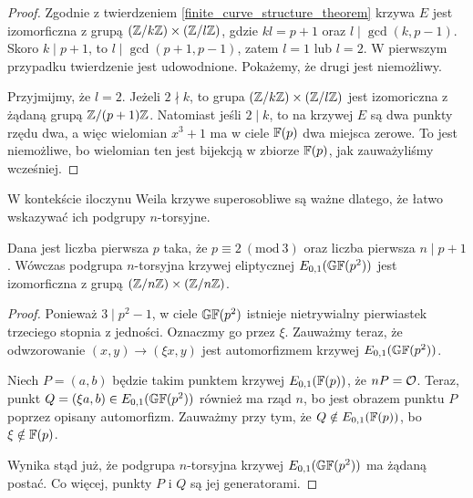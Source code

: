 \begin{proof}
Zgodnie z twierdzeniem \ref{finite_curve_structure_theorem}
krzywa $E$ jest izomorficzna z grupą $(\mathbb{Z} / k\mathbb{Z}) \times (\mathbb{Z} / l\mathbb{Z})$,
gdzie $kl = p+1$ oraz $l \mid \gcd(k, p-1)$.
Skoro $k \mid p+1$, to $l \mid \gcd(p+1, p-1)$,
zatem $l = 1$ lub $l = 2$.
W pierwszym przypadku twierdzenie jest udowodnione.
Pokażemy, że drugi jest niemożliwy.

Przyjmijmy, że $l = 2$.
Jeżeli $2 \nmid k$,
to grupa $(\mathbb{Z} / k\mathbb{Z}) \times (\mathbb{Z} / l\mathbb{Z})$ jest izomoriczna
z żądaną grupą $\mathbb{Z} / (p+1)\mathbb{Z}$.
Natomiast jeśli $2 \mid k$, to na krzywej $E$ są dwa punkty rzędu dwa,
a więc wielomian $x^3 + 1$ ma w ciele $\mathbb{F}(p)$ dwa miejsca zerowe.
To jest niemożliwe, bo wielomian ten jest bijekcją w zbiorze $\mathbb{F}(p)$,
jak zauważyliśmy wcześniej.
\end{proof}

W kontekście iloczynu Weila krzywe superosobliwe są ważne dlatego,
że łatwo wskazywać ich podgrupy $n$-torsyjne.

\begin{theorem}
Dana jest liczba pierwsza $p$ taka, że $p \equiv 2\ (\mathrm{mod}\ 3)$
oraz liczba pierwsza $n \mid p + 1$.
Wówczas podgrupa $n$-torsyjna krzywej eliptycznej $E_{0,1}(\mathbb{GF}(p^2))$
jest izomorficzna z grupą $(\mathbb{Z} / n\mathbb{Z}) \times (\mathbb{Z} / n\mathbb{Z})$.
\end{theorem}

\begin{proof}
Ponieważ $3 \mid p^2-1$, w ciele $\mathbb{GF}(p^2)$
istnieje nietrywialny pierwiastek trzeciego stopnia z jedności.
Oznaczmy go przez $\xi$.
Zauważmy teraz, że odwzorowanie $(x, y) \to (\xi x, y)$
jest automorfizmem krzywej $E_{0,1}(\mathbb{GF}(p^2))$.

Niech $P = (a, b)$ będzie takim punktem krzywej $E_{0,1}(\mathbb{F}(p))$,
że $nP = \mathcal{O}$.
Teraz, punkt $Q = (\xi a, b) \in E_{0,1}(\mathbb{GF}(p^2))$ również ma rząd $n$,
bo jest obrazem punktu $P$ poprzez opisany automorfizm.
Zauważmy przy tym, że $Q \notin E_{0,1}(\mathbb{F}(p))$,
bo $\xi \notin \mathbb{F}(p)$.

Wynika stąd już, że podgrupa $n$-torsyjna krzywej $E_{0,1}(\mathbb{GF}(p^2))$
ma żądaną postać. Co więcej, punkty $P$ i $Q$ są jej generatorami.
\end{proof}
